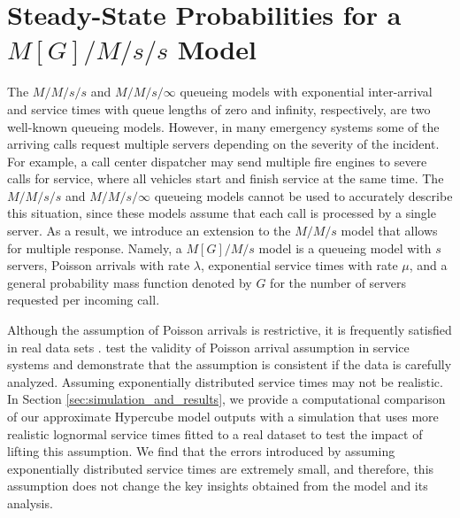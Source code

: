 \documentclass[11pt]{article}\topmargin 0mm
\begin{document}
\begin{table}
{\begin{tabular}{c p{3.8in} c}
\hline
\end{tabular}}
{%
}
\end{table}

\dspace

\section{Steady-State Probabilities for a $M[G]/M/s/s$ Model}
\label{sec:steady_state_probs} The $M/M/s/s$ and $M/M/s/\infty$
queueing models with exponential inter-arrival and service
times with queue lengths of zero and infinity, respectively,
are two well-known queueing models. However, in many emergency
systems some of the arriving calls request multiple servers
depending on the severity of the incident. For example, a call
center dispatcher may send multiple fire engines to severe
calls for service, where all vehicles start and finish service
at the same time. The $M/M/s/s$ and $M/M/s/\infty$ queueing
models cannot be used to accurately describe this situation,
since these models assume that each call is processed by a
single server. As a result, we introduce an extension to the
$M/M/s$ model that allows for multiple response. Namely, a
$M[G]/M/s$ model is a queueing model with $s$ servers, Poisson
arrivals with rate $\lambda$, exponential service times with
rate $\mu$, and a general probability mass function denoted by
$G$ for the number of servers requested per incoming call.

{\color{blue}
Although the assumption of Poisson arrivals is restrictive, it is frequently satisfied in real data sets \citep{galvao2008emergency,desouza2015incorporating}. \citet{kim2014call} test the validity of Poisson arrival assumption in service systems and demonstrate that the assumption is consistent if the data is carefully analyzed. Assuming exponentially distributed service times may not be realistic. In Section \ref{sec:simulation_and_results}, we provide a computational comparison of our approximate Hypercube model outputs with a simulation that uses more realistic lognormal service times fitted to a real dataset to test the impact of lifting this assumption. We find that the errors introduced by assuming exponentially distributed service times are extremely small, and therefore, this assumption does not change the key insights obtained from the model and its analysis.
}
\end{document}
